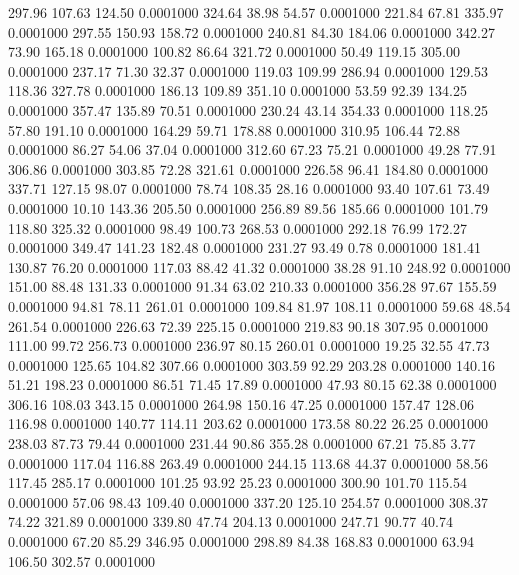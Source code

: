  297.96  107.63  124.50   0.0001000
 324.64   38.98   54.57   0.0001000
 221.84   67.81  335.97   0.0001000
 297.55  150.93  158.72   0.0001000
 240.81   84.30  184.06   0.0001000
 342.27   73.90  165.18   0.0001000
 100.82   86.64  321.72   0.0001000
  50.49  119.15  305.00   0.0001000
 237.17   71.30   32.37   0.0001000
 119.03  109.99  286.94   0.0001000
 129.53  118.36  327.78   0.0001000
 186.13  109.89  351.10   0.0001000
  53.59   92.39  134.25   0.0001000
 357.47  135.89   70.51   0.0001000
 230.24   43.14  354.33   0.0001000
 118.25   57.80  191.10   0.0001000
 164.29   59.71  178.88   0.0001000
 310.95  106.44   72.88   0.0001000
  86.27   54.06   37.04   0.0001000
 312.60   67.23   75.21   0.0001000
  49.28   77.91  306.86   0.0001000
 303.85   72.28  321.61   0.0001000
 226.58   96.41  184.80   0.0001000
 337.71  127.15   98.07   0.0001000
  78.74  108.35   28.16   0.0001000
  93.40  107.61   73.49   0.0001000
  10.10  143.36  205.50   0.0001000
 256.89   89.56  185.66   0.0001000
 101.79  118.80  325.32   0.0001000
  98.49  100.73  268.53   0.0001000
 292.18   76.99  172.27   0.0001000
 349.47  141.23  182.48   0.0001000
 231.27   93.49    0.78   0.0001000
 181.41  130.87   76.20   0.0001000
 117.03   88.42   41.32   0.0001000
  38.28   91.10  248.92   0.0001000
 151.00   88.48  131.33   0.0001000
  91.34   63.02  210.33   0.0001000
 356.28   97.67  155.59   0.0001000
  94.81   78.11  261.01   0.0001000
 109.84   81.97  108.11   0.0001000
  59.68   48.54  261.54   0.0001000
 226.63   72.39  225.15   0.0001000
 219.83   90.18  307.95   0.0001000
 111.00   99.72  256.73   0.0001000
 236.97   80.15  260.01   0.0001000
  19.25   32.55   47.73   0.0001000
 125.65  104.82  307.66   0.0001000
 303.59   92.29  203.28   0.0001000
 140.16   51.21  198.23   0.0001000
  86.51   71.45   17.89   0.0001000
  47.93   80.15   62.38   0.0001000
 306.16  108.03  343.15   0.0001000
 264.98  150.16   47.25   0.0001000
 157.47  128.06  116.98   0.0001000
 140.77  114.11  203.62   0.0001000
 173.58   80.22   26.25   0.0001000
 238.03   87.73   79.44   0.0001000
 231.44   90.86  355.28   0.0001000
  67.21   75.85    3.77   0.0001000
 117.04  116.88  263.49   0.0001000
 244.15  113.68   44.37   0.0001000
  58.56  117.45  285.17   0.0001000
 101.25   93.92   25.23   0.0001000
 300.90  101.70  115.54   0.0001000
  57.06   98.43  109.40   0.0001000
 337.20  125.10  254.57   0.0001000
 308.37   74.22  321.89   0.0001000
 339.80   47.74  204.13   0.0001000
 247.71   90.77   40.74   0.0001000
  67.20   85.29  346.95   0.0001000
 298.89   84.38  168.83   0.0001000
  63.94  106.50  302.57   0.0001000
